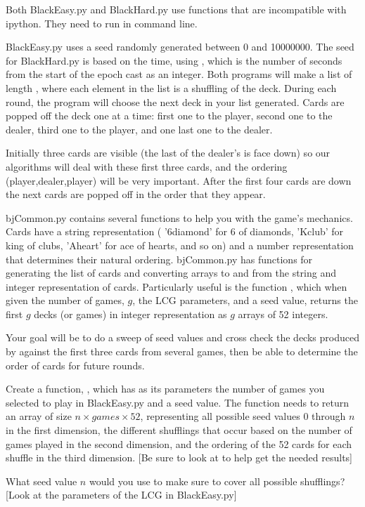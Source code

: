 \begin{warn}
Both BlackEasy.py and BlackHard.py use functions that are incompatible with ipython. They need to run  in command line.
\end{warn}

BlackEasy.py uses a seed randomly generated between 0 and 10000000.
The seed for BlackHard.py is based on the time, using , which is the number of seconds from the start of the epoch cast as an integer.
Both programs will make a list of length , where each element in the list is a shuffling of the deck.
During each round, the program will choose the next deck in your list generated.
Cards are popped off the deck one at a time: first one to the player, second one to the dealer, third one to the player, and one last one to the dealer. 

Initially three cards are visible (the last of the dealer's is face down) so our algorithms will deal with these first three cards, and the ordering (player,dealer,player) will be very important. 
After the first four cards are down the next cards are popped off in the order that they appear. 

bjCommon.py contains several functions to help you with the game's mechanics.
Cards have a string representation ( '6diamond' for 6 of diamonds, 'Kclub' for king of clubs, 'Aheart' for ace of hearts, and so on) and a number representation that determines their natural ordering. 
bjCommon.py has functions for generating the list of cards and converting arrays to and from the string and integer representation of cards. 
Particularly useful is the function , which when given the number of games, $g$, the LCG parameters, and a seed value, returns the first $g$ decks (or games) in integer representation as $g$ arrays of 52 integers.

Your goal will be to do a sweep of seed values and cross check the decks produced by  against the first three cards from several games, then be able to determine the order of cards for future rounds.


\begin{problem}\label{sweeps}

Create a function, , which has as its parameters the number of games you selected to play in BlackEasy.py and a seed value.
The function needs to return an array of size $n\times games \times 52$, representing all possible seed values 0 through $n$ in the first dimension, the different shufflings that occur based on the number of games played in the second dimension, and the ordering of the 52 cards for each shuffle in the third dimension.
[Be sure to look at  to help get the needed results]

What seed value $n$ would you use to make sure to cover all possible shufflings? [Look at the parameters of the LCG in BlackEasy.py]

\end{problem}

